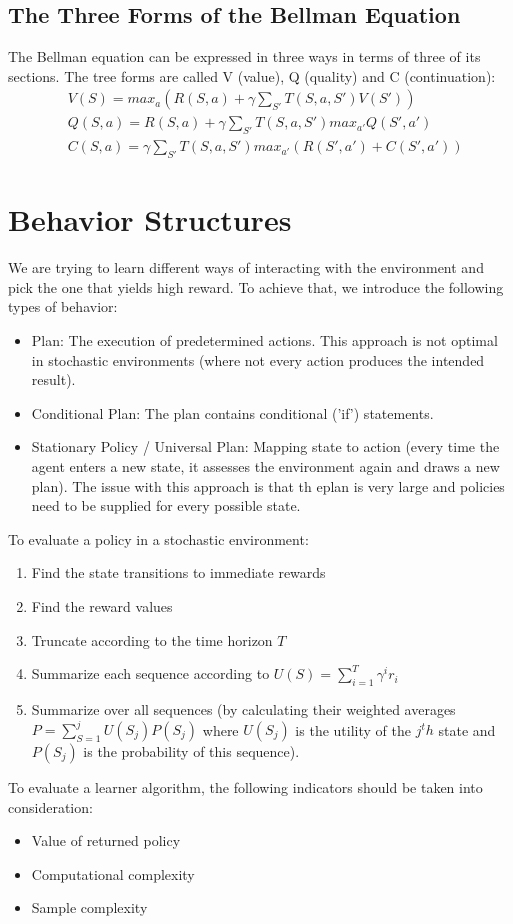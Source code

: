\documentclass{article}
\begin{document}
\subsection{The Three Forms of the Bellman Equation}
The Bellman equation can be expressed in three ways in terms of three of its sections. The tree forms are called V (value), Q (quality) and C (continuation):
\begin{align}
  &V(S) = max_a \left( R(S, a) + \gamma \sum_{S'} T(S, a, S') V(S') \right)\\
  &Q(S, a) = R(S, a) + \gamma \sum_{S'} T(S, a, S') max_{a'} Q(S', a')\\
  &C(S, a) = \gamma \sum_{S'} T(S, a, S') max_{a'} \left( R(S', a') + C(S', a') \right)
\end{align}
\section{Behavior Structures}
We are trying to learn different ways of interacting with the environment and pick the one that yields high reward. To achieve that, we introduce the following types of behavior:
\begin{itemize}
  \item Plan: The execution of predetermined actions. This approach is not optimal in stochastic environments (where not every action produces the intended result).
  \item Conditional Plan: The plan contains conditional ('if') statements.
  \item Stationary Policy / Universal Plan: Mapping state to action (every time the agent enters a new state, it assesses the environment again and draws a new plan). The issue with this approach is that th eplan is very large and policies need to be supplied for every possible state.
\end{itemize}
To evaluate a policy in a stochastic environment:
\begin{enumerate}
  \item Find the state transitions to immediate rewards
  \item Find the reward values
  \item Truncate according to the time horizon $T$
  \item Summarize each sequence according to $U(S) = \sum_{i = 1}^{T} \gamma^i r_i$
  \item Summarize over all sequences (by calculating their weighted averages $P = \sum_{S = 1}^{j} U(S_j) P(S_j)$ where $U(S_j)$ is the utility of the $j^th$ state and $P(S_j)$ is the probability of this sequence).
\end{enumerate}
To evaluate a learner algorithm, the following indicators should be taken into consideration:
\begin{itemize}
  \item Value of returned policy
  \item Computational complexity
  \item Sample complexity
\end{itemize}
\end{document}
